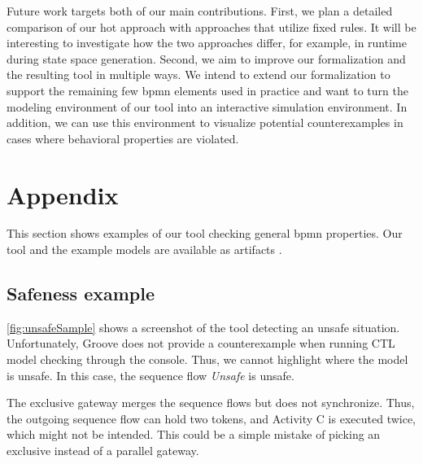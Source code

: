 \documentclass[runningheads]{llncs}
\begin{document}
Future work targets both of our main contributions.
First, we plan a detailed comparison of our \gls*{hot} approach with approaches that utilize fixed rules.
It will be interesting to investigate how the two approaches differ, for example, in runtime during state space generation.
Second, we aim to improve our formalization and the resulting tool in multiple ways.
We intend to extend our formalization to support the remaining few \gls*{bpmn} elements used in practice and want to turn the modeling environment of our tool into an interactive simulation environment.
In addition, we can use this environment to visualize potential counterexamples in cases where behavioral properties are violated.

 


\section{Appendix}


This section shows examples of our tool checking general \gls*{bpmn} properties.
Our tool and the example models are available as artifacts \cite{krauterArtifactsICGT2023}.

\subsection{Safeness example}
\autoref{fig:unsafeSample} shows a screenshot of the tool detecting an unsafe situation.
Unfortunately, Groove does not provide a counterexample when running CTL model checking through the console.
Thus, we cannot highlight where the model is unsafe.
In this case, the sequence flow \textit{Unsafe} is unsafe.

The exclusive gateway merges the sequence flows but does not synchronize.
Thus, the outgoing sequence flow can hold two tokens, and Activity C is executed twice, which might not be intended.
This could be a simple mistake of picking an exclusive instead of a parallel gateway.
\end{document}
